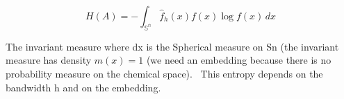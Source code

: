 \[ H(A) = -\int_\mathbb{{S}^n}  \hat{f}_h(x)f(x)\log f(x)\,dx  \]



The invariant measure where dx is the Spherical measure on Sn (the invariant measure has density $m(x)=1$ (we need an embedding because there is no probability measure on the chemical space). 
This entropy depends on the bandwidth h and on the embedding.
